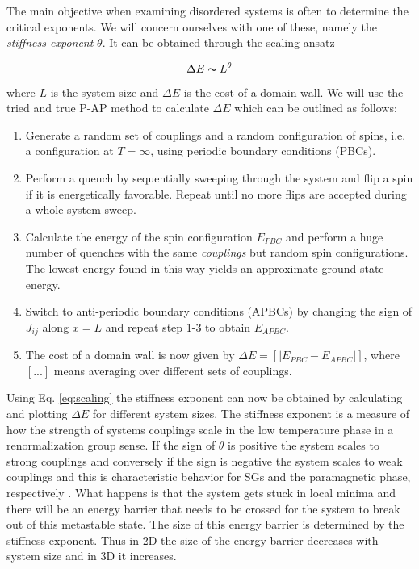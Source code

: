\documentclass[paper=a4, fontsize=11pt]{scrartcl} %
\numberwithin{equation}{section} %
\numberwithin{figure}{section} %
\numberwithin{table}{section} %
\newcommand{\commutator}[1]{\ensuremath{\left[ #1 \right]}}
\begin{document}
The main objective when examining disordered systems is often to determine the critical exponents. We will concern ourselves with one of these, namely the \emph{stiffness exponent} $\theta$. It can be obtained through the scaling ansatz

\begin{equation}
\Delta E \thicksim L^\theta
\label{eq:scaling}
\end{equation}
where $L$ is the system size and $\Delta E$ is the cost of a domain wall. We will use the tried and true P-AP method\cite{hartmann}\cite{carter} to calculate $\Delta E$ which can be outlined as follows:

\begin{enumerate}
\item Generate a random set of couplings and a random configuration of spins, i.e. a configuration at $T=\infty$, using periodic boundary conditions (PBCs).
\item Perform a quench by sequentially sweeping through the system and flip a spin if it is energetically favorable. Repeat until no more flips are accepted during a whole system sweep.
\item Calculate the energy of the spin configuration $E_{PBC}$ and perform a huge number of quenches with the same \emph{couplings} but random spin configurations. The lowest energy found in this way yields an approximate ground state energy.
\item Switch to anti-periodic boundary conditions (APBCs) by changing the sign of $J_{ij}$ along $x=L$ and repeat step 1-3 to obtain $E_{APBC}$.
\item The cost of a domain wall is now given by $\Delta E = \commutator{|E_{PBC}-E_{APBC}|}$, where $[...]$ means averaging over different sets of couplings.
\end{enumerate}
Using Eq. \eqref{eq:scaling} the stiffness exponent can now be obtained by calculating and plotting $\Delta E$ for different system sizes. The stiffness exponent is a measure of how the strength of systems couplings scale in the low temperature phase in a renormalization group sense. If the sign of $\theta$ is positive the system scales to strong couplings and conversely if the sign is negative the system scales to weak couplings and this is characteristic behavior for SGs and the paramagnetic phase, respectively \cite{almeida}. What happens is that the system gets stuck in local minima and there will be an energy barrier that needs to be crossed for the system to break out of this metastable state. The size of this energy barrier is determined by the stiffness exponent. Thus in 2D the size of the energy barrier decreases with system size and in 3D it increases.
\end{document}
